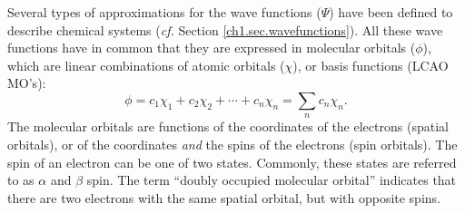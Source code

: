 Several types of approximations for the wave functions ($\Psi$) have been defined to describe chemical systems (\textit{cf.} Section \ref{ch1.sec.wavefunctions}). All these wave functions have in common that they are expressed in molecular orbitals ($\phi$), which are linear combinations of atomic orbitals ($\chi$), or basis functions (LCAO MO's):
\begin{equation}
\phi = c_1 \chi_1 + c_2 \chi_2 + \cdots + c_n \chi_n = \sum_n c_n \chi_n.
\end{equation}
The molecular orbitals are functions of the coordinates of the electrons (spatial orbitals), or of the coordinates \textit{and} the spins of the electrons (spin orbitals). The spin of an electron can be one of two states. Commonly, these states are referred to as $\alpha$ and $\beta$ spin. The term ``doubly occupied molecular orbital'' indicates that there are two electrons with the same spatial orbital, but with opposite spins.

